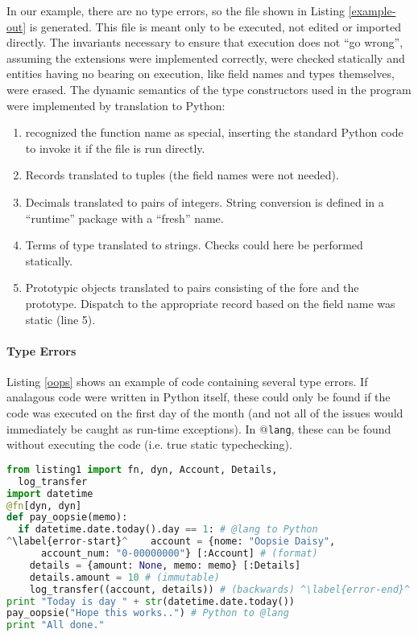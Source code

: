 In our example, there are no type errors, so the file shown in Listing \ref{example-out}  is generated. This file is meant only to be executed, not edited or imported directly. The invariants necessary to ensure that execution does not ``go wrong'', assuming the extensions were implemented correctly, were checked statically and entities having no bearing on execution, like field names and types themselves, were erased. The dynamic semantics of the type constructors used in the program were implemented by translation to Python:%
\begin{enumerate}
\item {} recognized the function name  as special, inserting the standard Python code to invoke it if the file is run directly.
\item Records translated to tuples (the field names were not needed).
\item Decimals translated to pairs of integers. String conversion is defined in a ``runtime'' package with a ``fresh'' name.
\item Terms of type  translated to strings. Checks could here be performed  statically.%
\item Prototypic objects translated to pairs consisting of the fore and the prototype. Dispatch to the appropriate record based on the field name was static (line 5).
\end{enumerate}


\paragraph{Type Errors} Listing \ref{oops} shows an example of code containing several type errors. If analagous code were written in Python itself, these could only be found if the code was executed on the first day of the month (and not all of the issues would  immediately be caught as run-time exceptions). In @\texttt{lang}, these can be found without executing the code (i.e. true static typechecking).

\begin{codelisting}[t]
\begin{lstlisting}[language=Python]
from listing1 import fn, dyn, Account, Details, 
  log_transfer
import datetime
@fn[dyn, dyn]
def pay_oopsie(memo):
  if datetime.date.today().day == 1: # @lang to Python
^\label{error-start}^    account = {nome: "Oopsie Daisy", 
      account_num: "0-00000000"} [:Account] # (format)
    details = {amount: None, memo: memo} [:Details]
    details.amount = 10 # (immutable)
    log_transfer((account, details)) # (backwards) ^\label{error-end}^
print "Today is day " + str(datetime.date.today())
pay_oopsie("Hope this works..") # Python to @lang
print "All done."
\end{lstlisting}
\caption{[\texttt{listing\ref{oops}.py}] Lines \ref{error-start}-\ref{error-end} each have a type error.}
\label{oops}
\end{codelisting}
